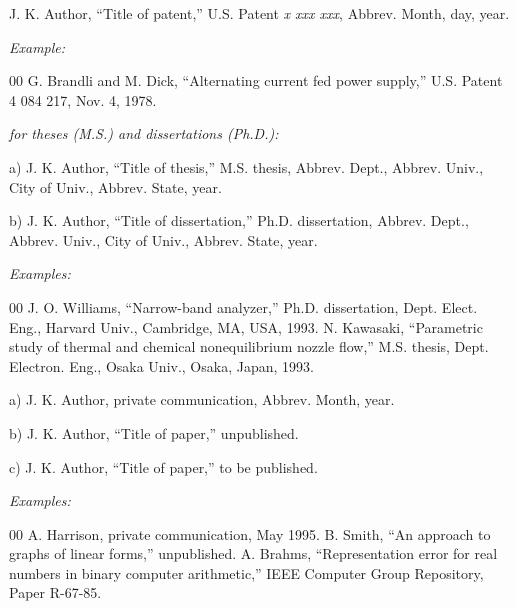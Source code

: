 \documentclass{ieeetj}
\begin{document}

\noindent J. K. Author, ``Title of patent,'' U.S. Patent {\it x xxx xxx}, Abbrev. Month, day, year.

{\it Example:}

\begin{thebibliography}{00}
 G. Brandli and M. Dick, ``Alternating current fed power supply,'' U.S. Patent 4 084 217, Nov. 4, 1978.
\end{thebibliography}

 {\it for theses (M.S.) and dissertations (Ph.D.):}

\noindent a) J. K. Author, ``Title of thesis,'' M.S. thesis, Abbrev. Dept., Abbrev.
Univ., City of Univ., Abbrev. State, year.

\noindent b) J. K. Author, ``Title of dissertation,'' Ph.D. dissertation, Abbrev.
Dept., Abbrev. Univ., City of Univ., Abbrev. State, year.

{\it Examples:}

\begin{thebibliography}{00}
 J. O. Williams, ``Narrow-band analyzer,'' Ph.D. dissertation, Dept. Elect. Eng., Harvard Univ., Cambridge, MA, USA, 1993.
 N. Kawasaki, ``Parametric study of thermal and chemical nonequilibrium nozzle flow,'' M.S. thesis, Dept. Electron. Eng., Osaka Univ., Osaka, Japan, 1993.
\end{thebibliography}


\noindent a) J. K. Author, private communication, Abbrev. Month, year.

\noindent b) J. K. Author, ``Title of paper,'' unpublished.

\noindent c) J. K. Author, ``Title of paper,'' to be published.

{\it Examples:}

\begin{thebibliography}{00}
 A. Harrison, private communication, May 1995.
 B. Smith, ``An approach to graphs of linear forms,'' unpublished.
 A. Brahms, ``Representation error for real numbers in binary computer arithmetic,'' IEEE Computer Group Repository, Paper R-67-85.
\end{thebibliography}

\end{document}

